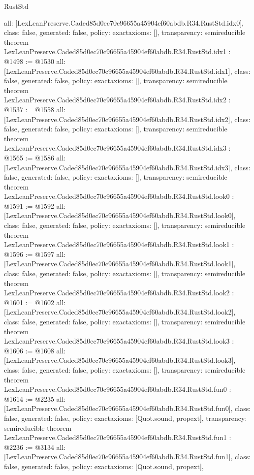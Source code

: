 \begin{lexlean}{RustStd}
\begin{coremodule}
{  all: [LexLeanPreserve.Caded85d0ec70c96655a45904ef60abdb.R34.RustStd.idx0],
  class: false,
  generated: false,
  policy: exact{axioms: []},
  transparency: semireducible
}
theorem LexLeanPreserve.Caded85d0ec70c96655a45904ef60abdb.R34.RustStd.idx1 : @1498 := @1530 {
  all: [LexLeanPreserve.Caded85d0ec70c96655a45904ef60abdb.R34.RustStd.idx1],
  class: false,
  generated: false,
  policy: exact{axioms: []},
  transparency: semireducible
}
theorem LexLeanPreserve.Caded85d0ec70c96655a45904ef60abdb.R34.RustStd.idx2 : @1537 := @1558 {
  all: [LexLeanPreserve.Caded85d0ec70c96655a45904ef60abdb.R34.RustStd.idx2],
  class: false,
  generated: false,
  policy: exact{axioms: []},
  transparency: semireducible
}
theorem LexLeanPreserve.Caded85d0ec70c96655a45904ef60abdb.R34.RustStd.idx3 : @1565 := @1586 {
  all: [LexLeanPreserve.Caded85d0ec70c96655a45904ef60abdb.R34.RustStd.idx3],
  class: false,
  generated: false,
  policy: exact{axioms: []},
  transparency: semireducible
}
theorem LexLeanPreserve.Caded85d0ec70c96655a45904ef60abdb.R34.RustStd.look0 : @1591 := @1592 {
  all: [LexLeanPreserve.Caded85d0ec70c96655a45904ef60abdb.R34.RustStd.look0],
  class: false,
  generated: false,
  policy: exact{axioms: []},
  transparency: semireducible
}
theorem LexLeanPreserve.Caded85d0ec70c96655a45904ef60abdb.R34.RustStd.look1 : @1596 := @1597 {
  all: [LexLeanPreserve.Caded85d0ec70c96655a45904ef60abdb.R34.RustStd.look1],
  class: false,
  generated: false,
  policy: exact{axioms: []},
  transparency: semireducible
}
theorem LexLeanPreserve.Caded85d0ec70c96655a45904ef60abdb.R34.RustStd.look2 : @1601 := @1602 {
  all: [LexLeanPreserve.Caded85d0ec70c96655a45904ef60abdb.R34.RustStd.look2],
  class: false,
  generated: false,
  policy: exact{axioms: []},
  transparency: semireducible
}
theorem LexLeanPreserve.Caded85d0ec70c96655a45904ef60abdb.R34.RustStd.look3 : @1606 := @1608 {
  all: [LexLeanPreserve.Caded85d0ec70c96655a45904ef60abdb.R34.RustStd.look3],
  class: false,
  generated: false,
  policy: exact{axioms: []},
  transparency: semireducible
}
theorem LexLeanPreserve.Caded85d0ec70c96655a45904ef60abdb.R34.RustStd.fun0 : @1614 := @2235 {
  all: [LexLeanPreserve.Caded85d0ec70c96655a45904ef60abdb.R34.RustStd.fun0],
  class: false,
  generated: false,
  policy: exact{axioms: [Quot.sound, propext]},
  transparency: semireducible
}
theorem LexLeanPreserve.Caded85d0ec70c96655a45904ef60abdb.R34.RustStd.fun1 : @2236 := @3134 {
  all: [LexLeanPreserve.Caded85d0ec70c96655a45904ef60abdb.R34.RustStd.fun1],
  class: false,
  generated: false,
  policy: exact{axioms: [Quot.sound, propext]},
}
\end{coremodule}
\end{lexlean}
